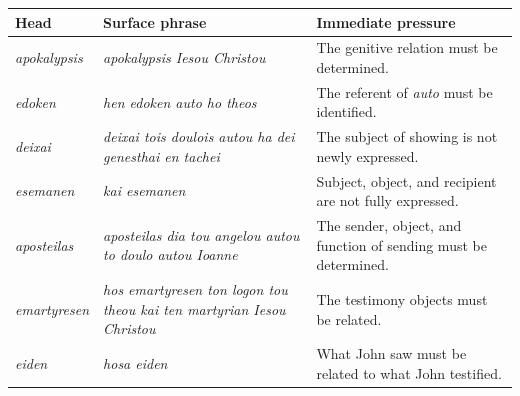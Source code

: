 \begin{center}
\begin{longtable}{@{}L{0.18\textwidth}L{0.42\textwidth}L{0.3\textwidth}@{}}
\toprule
Head & Surface phrase & Immediate pressure \\
\midrule
\textit{apokalypsis} & \textit{apokalypsis Iesou Christou} & The genitive relation must be determined. \\
\textit{edoken} & \textit{hen edoken auto ho theos} & The referent of \textit{auto} must be identified. \\
\textit{deixai} & \textit{deixai tois doulois autou ha dei genesthai en tachei} & The subject of showing is not newly expressed. \\
\textit{esemanen} & \textit{kai esemanen} & Subject, object, and recipient are not fully expressed. \\
\textit{aposteilas} & \textit{aposteilas dia tou angelou autou to doulo autou Ioanne} & The sender, object, and function of sending must be determined. \\
\textit{emartyresen} & \textit{hos emartyresen ton logon tou theou kai ten martyrian Iesou Christou} & The testimony objects must be related. \\
\textit{eiden} & \textit{hosa eiden} & What John saw must be related to what John testified. \\
\bottomrule
\end{longtable}
\end{center}
